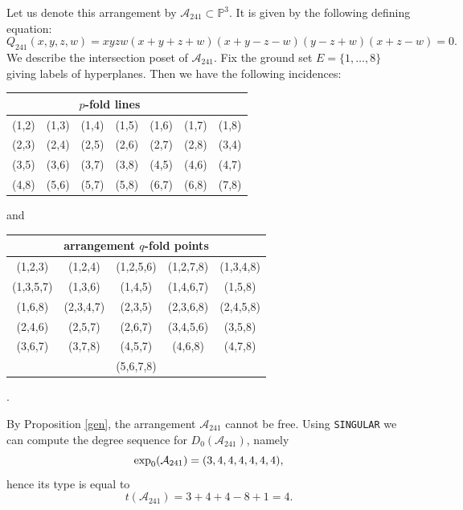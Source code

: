 \documentclass[11pt]{article}
\theoremstyle{plain}
\theoremstyle{definition}
\begin{document}
\noindent
{}
\vskip 5pt
\noindent
Let us denote this arrangement by $\mathcal{A}_{241} \subset \mathbb{P}^{3}$. It is given by the following defining equation:
$$Q_{241}(x,y,z,w) = xyzw(x+y+z+w)(x+y-z-w)(y-z+w)(x+z-w)=0.$$
We describe the intersection poset of $\mathcal{A}_{241}$. Fix the ground set $E= \{1, \ldots , 8\}$ giving labels of hyperplanes. Then we have the following incidences:
\begin{center}
\begin{tabular}{ c c c c c c c }
\multicolumn{6}{c}{$p$-fold lines} \\\hline \hline
 (1,2) &  (1,3) &  (1,4) &  (1,5) &  (1,6) &  (1,7) &  (1,8)\\
 (2,3) &  (2,4) &  (2,5) &  (2,6) &  (2,7) &  (2,8) &  (3,4)\\
 (3,5) &  (3,6) &  (3,7) &  (3,8) &  (4,5) &  (4,6) &  (4,7)\\
 (4,8) &  (5,6) & (5,7) & (5,8) & (6,7) &  (6,8) &  (7,8)
\end{tabular}
\end{center}
and 
\begin{center}
\begin{tabular}{ c c c c c }
\multicolumn{5}{c}{arrangement $q$-fold points} \\ \hline \hline 
(1,2,3) &  (1,2,4) &  (1,2,5,6) &  (1,2,7,8) &  (1,3,4,8) \\
(1,3,5,7) & (1,3,6) & (1,4,5) & (1,4,6,7) &  (1,5,8)\\
(1,6,8) &  (2,3,4,7) & (2,3,5) &  (2,3,6,8) &  (2,4,5,8)\\
(2,4,6) & (2,5,7) & (2,6,7) & (3,4,5,6) &  (3,5,8) \\
(3,6,7) & (3,7,8) & (4,5,7) & (4,6,8) &  (4,7,8)\\
& & (5,6,7,8) & &
\end{tabular}.
\end{center}
By Proposition \ref{gen}, the arrangement $\mathcal{A}_{241}$ cannot be free. Using \texttt{SINGULAR} we can compute the degree sequence for $D_{0}(\mathcal{A}_{241})$, namely
$${\rm exp}_{0}(\mathcal{A}_{241}) = (3,4,4,4,4,4,4),$$
hence its type is equal to
$$t(\mathcal{A}_{241})= 3 + 4 + 4 - 8+1 = 4.$$
\end{document}
